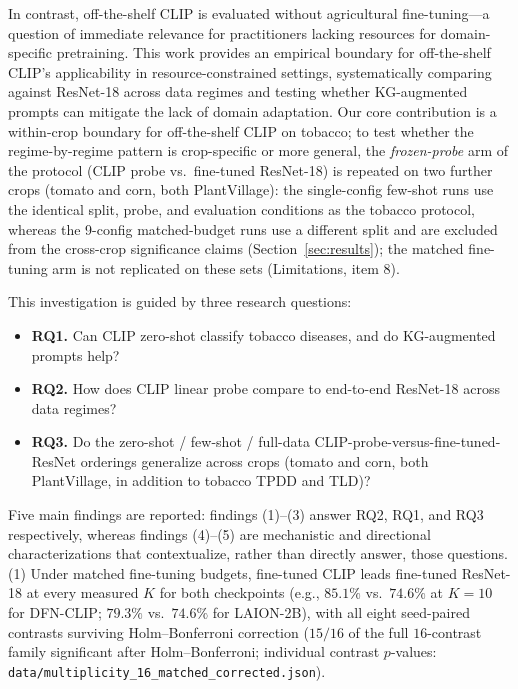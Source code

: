 \documentclass[10pt,a4paper]{article}
\begin{document}
In contrast, off-the-shelf CLIP is evaluated without agricultural fine-tuning---a question of immediate relevance for practitioners lacking resources for domain-specific pretraining. This work provides an empirical boundary for off-the-shelf CLIP's applicability in resource-constrained settings, systematically comparing against ResNet-18 across data regimes and testing whether KG-augmented prompts can mitigate the lack of domain adaptation. Our core contribution is a within-crop boundary for off-the-shelf CLIP on tobacco; to test whether the regime-by-regime pattern is crop-specific or more general, the \emph{frozen-probe} arm of the protocol (CLIP probe vs.\ fine-tuned ResNet-18) is repeated on two further crops (tomato and corn, both PlantVillage): the single-config few-shot runs use the identical split, probe, and evaluation conditions as the tobacco protocol, whereas the 9-config matched-budget runs use a different split and are excluded from the cross-crop significance claims (Section~\ref{sec:results}); the matched fine-tuning arm is not replicated on these sets (Limitations, item 8).

This investigation is guided by three research questions:

\begin{itemize}
    \item \textbf{RQ1.} Can CLIP zero-shot classify tobacco diseases, and do KG-augmented prompts help?
    \item \textbf{RQ2.} How does CLIP linear probe compare to end-to-end ResNet-18 across data regimes?
    \item \textbf{RQ3.} Do the zero-shot / few-shot / full-data CLIP-probe-versus-fine-tuned-ResNet orderings generalize across crops (tomato and corn, both PlantVillage, in addition to tobacco TPDD and TLD)?
\end{itemize}

Five main findings are reported: findings (1)--(3) answer RQ2, RQ1, and RQ3 respectively, whereas findings (4)--(5) are mechanistic and directional characterizations that contextualize, rather than directly answer, those questions.
(1) Under matched fine-tuning budgets, fine-tuned CLIP leads fine-tuned ResNet-18 at every measured $K$ for both checkpoints (e.g., $85.1\%$ vs.\ $74.6\%$ at $K{=}10$ for DFN-CLIP; $79.3\%$ vs.\ $74.6\%$ for LAION-2B), with all eight seed-paired contrasts surviving Holm--Bonferroni correction ($15/16$ of the full $16$-contrast family significant after Holm--Bonferroni; individual contrast $p$-values: \texttt{data/multiplicity\_16\_matched\_corrected.json}).
\end{document}
